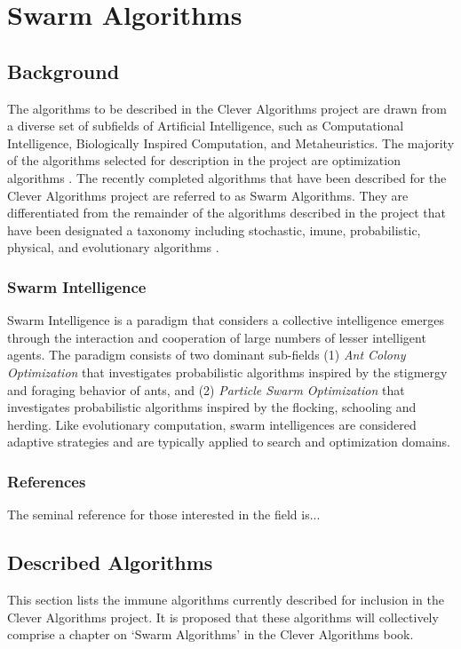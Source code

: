 \documentclass[a4paper, 11pt]{article}
\begin{document}
\section{Swarm Algorithms}
\label{sec:algorithms}

% 
% 
\subsection{Background}
The algorithms to be described in the Clever Algorithms project are drawn from a diverse set of subfields of Artificial Intelligence, such as Computational Intelligence, Biologically Inspired Computation, and Metaheuristics. The majority of the algorithms selected for description in the project are optimization algorithms \cite{Brownlee2010b}. 
The recently completed algorithms that have been described for the Clever Algorithms project are referred to as Swarm Algorithms. They are differentiated from the remainder of the algorithms described in the project that have been designated a taxonomy including stochastic, imune, probabilistic, physical, and evolutionary algorithms \cite{Brownlee2010b}. 

\subsubsection{Swarm Intelligence}
Swarm Intelligence is a paradigm that considers a collective intelligence emerges through the interaction and cooperation of large numbers of lesser intelligent agents. The paradigm consists of two dominant sub-fields (1) \emph{Ant Colony Optimization} that investigates probabilistic algorithms inspired by the stigmergy and foraging behavior of ants, and (2) \emph{Particle Swarm Optimization} that investigates probabilistic algorithms inspired by the flocking, schooling and herding. Like evolutionary computation, swarm intelligences are considered adaptive strategies and are typically applied to search and optimization domains.

\subsubsection{References}
The seminal reference for those interested in the field is...

% 
% 
\subsection{Described Algorithms}
\label{subsec:algorithms}
This section lists the immune algorithms currently described for inclusion in the Clever Algorithms project. It is proposed that these algorithms will collectively comprise a chapter on `Swarm Algorithms' in the Clever Algorithms book. 
\end{document}
